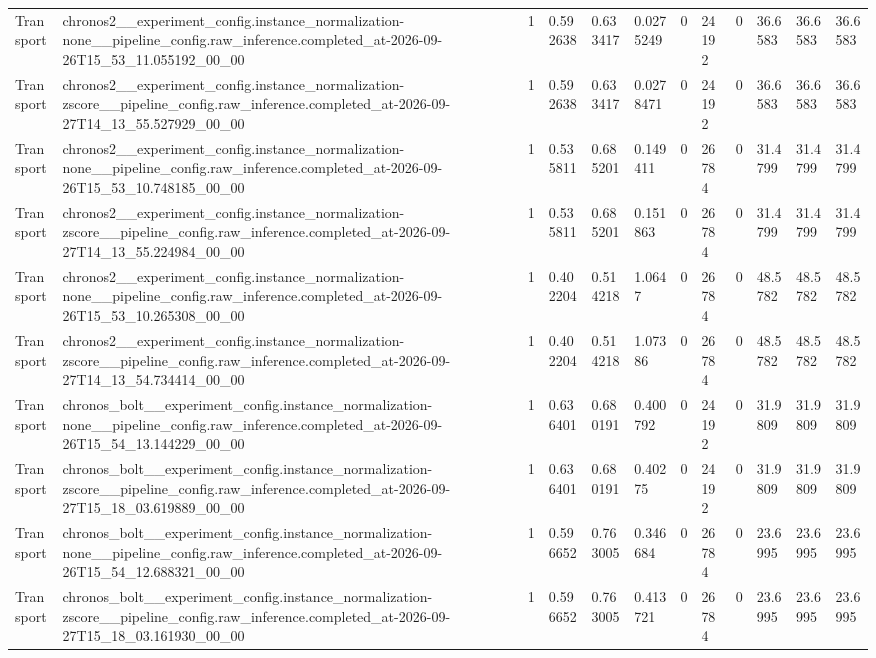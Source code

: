 \begin{tabular}{llllllllllll}
Transport & chronos2\_\_experiment\_config.instance\_normalization-none\_\_pipeline\_config.raw\_inference.completed\_at-2026-09-26T15\_53\_11.055192\_00\_00 & 1 & 0.592638 & 0.633417 & 0.0275249 & 0 & 24192 & 0 & 36.6583 & 36.6583 & 36.6583 \\
Transport & chronos2\_\_experiment\_config.instance\_normalization-zscore\_\_pipeline\_config.raw\_inference.completed\_at-2026-09-27T14\_13\_55.527929\_00\_00 & 1 & 0.592638 & 0.633417 & 0.0278471 & 0 & 24192 & 0 & 36.6583 & 36.6583 & 36.6583 \\
Transport & chronos2\_\_experiment\_config.instance\_normalization-none\_\_pipeline\_config.raw\_inference.completed\_at-2026-09-26T15\_53\_10.748185\_00\_00 & 1 & 0.535811 & 0.685201 & 0.149411 & 0 & 26784 & 0 & 31.4799 & 31.4799 & 31.4799 \\
Transport & chronos2\_\_experiment\_config.instance\_normalization-zscore\_\_pipeline\_config.raw\_inference.completed\_at-2026-09-27T14\_13\_55.224984\_00\_00 & 1 & 0.535811 & 0.685201 & 0.151863 & 0 & 26784 & 0 & 31.4799 & 31.4799 & 31.4799 \\
Transport & chronos2\_\_experiment\_config.instance\_normalization-none\_\_pipeline\_config.raw\_inference.completed\_at-2026-09-26T15\_53\_10.265308\_00\_00 & 1 & 0.402204 & 0.514218 & 1.0647 & 0 & 26784 & 0 & 48.5782 & 48.5782 & 48.5782 \\
Transport & chronos2\_\_experiment\_config.instance\_normalization-zscore\_\_pipeline\_config.raw\_inference.completed\_at-2026-09-27T14\_13\_54.734414\_00\_00 & 1 & 0.402204 & 0.514218 & 1.07386 & 0 & 26784 & 0 & 48.5782 & 48.5782 & 48.5782 \\
Transport & chronos\_bolt\_\_experiment\_config.instance\_normalization-none\_\_pipeline\_config.raw\_inference.completed\_at-2026-09-26T15\_54\_13.144229\_00\_00 & 1 & 0.636401 & 0.680191 & 0.400792 & 0 & 24192 & 0 & 31.9809 & 31.9809 & 31.9809 \\
Transport & chronos\_bolt\_\_experiment\_config.instance\_normalization-zscore\_\_pipeline\_config.raw\_inference.completed\_at-2026-09-27T15\_18\_03.619889\_00\_00 & 1 & 0.636401 & 0.680191 & 0.40275 & 0 & 24192 & 0 & 31.9809 & 31.9809 & 31.9809 \\
Transport & chronos\_bolt\_\_experiment\_config.instance\_normalization-none\_\_pipeline\_config.raw\_inference.completed\_at-2026-09-26T15\_54\_12.688321\_00\_00 & 1 & 0.596652 & 0.763005 & 0.346684 & 0 & 26784 & 0 & 23.6995 & 23.6995 & 23.6995 \\
Transport & chronos\_bolt\_\_experiment\_config.instance\_normalization-zscore\_\_pipeline\_config.raw\_inference.completed\_at-2026-09-27T15\_18\_03.161930\_00\_00 & 1 & 0.596652 & 0.763005 & 0.413721 & 0 & 26784 & 0 & 23.6995 & 23.6995 & 23.6995 \\

\end{tabular}

